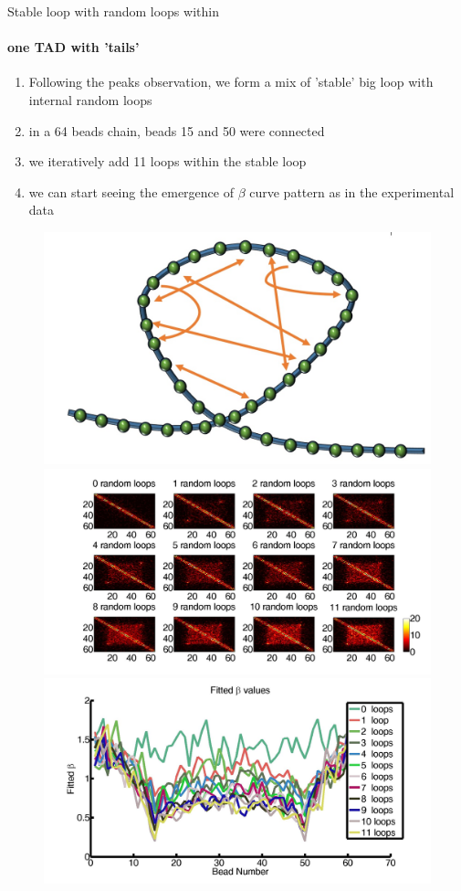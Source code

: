 \documentclass[8pt]{beamer}
\begin{document}
\begin{frame}{Stable loop with random loops within}
\framesubtitle{one TAD with 'tails'}
\begin{enumerate}
\item Following the peaks observation, we form a mix of 'stable' big loop with internal random loops
\item in a 64 beads chain, beads 15 and 50 were connected
\item we iteratively add 11 loops within the stable loop
\item we can start seeing the emergence of $\beta$ curve pattern as in the experimental data
\end{enumerate}
\begin{figure}[H]
\includegraphics[scale=0.06]{polymerModelWithLoopAndInternalConnectors}
\includegraphics[scale=0.08]{encounterHistogram_randomInternalLoops64BeadChain}
\includegraphics[scale=0.08]{fittedExpOneTADWithTails64Beads1To11Loops}
\end{figure}
\end{frame}
\end{document}
